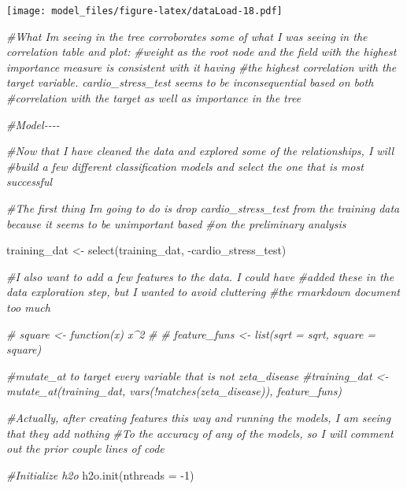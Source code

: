 \documentclass[
]{article}
\newenvironment{Shaded}{\begin{snugshade}}{\end{snugshade}}
\newcommand{\AttributeTok}[1]{\textcolor[rgb]{0.77,0.63,0.00}{#1}}
\newcommand{\CommentTok}[1]{\textcolor[rgb]{0.56,0.35,0.01}{\textit{#1}}}
\newcommand{\DecValTok}[1]{\textcolor[rgb]{0.00,0.00,0.81}{#1}}
\newcommand{\FunctionTok}[1]{\textcolor[rgb]{0.00,0.00,0.00}{#1}}
\newcommand{\NormalTok}[1]{#1}
\newcommand{\OtherTok}[1]{\textcolor[rgb]{0.56,0.35,0.01}{#1}}
\newcommand{\SpecialCharTok}[1]{\textcolor[rgb]{0.00,0.00,0.00}{#1}}
\begin{document}
\texttt{[image: model\_files/figure-latex/dataLoad-18.pdf]}

\begin{Shaded}
\begin{Highlighting}[]
\CommentTok{\#What I\textquotesingle{}m seeing in the tree corroborates some of what I was seeing in the correlation table and plot:}
\CommentTok{\#weight as the root node and the field with the highest importance measure is consistent with it having}
\CommentTok{\#the highest correlation with the target variable. cardio\_stress\_test seems to be inconsequential based on both}
\CommentTok{\#correlation with the target as well as importance in the tree}
\end{Highlighting}
\end{Shaded}

\begin{Shaded}
\begin{Highlighting}[]
\CommentTok{\#Model{-}{-}{-}{-}}

\CommentTok{\#Now that I have cleaned the data and explored some of the relationships, I will }
\CommentTok{\#build a few different classification models and select the one that is most successful}


\CommentTok{\#The first thing I\textquotesingle{}m going to do is drop cardio\_stress\_test from the training data because it seems to be unimportant based }
\CommentTok{\#on the preliminary analysis}

\NormalTok{training\_dat }\OtherTok{\textless{}{-}} \FunctionTok{select}\NormalTok{(training\_dat, }\SpecialCharTok{{-}}\NormalTok{cardio\_stress\_test)}

\CommentTok{\#I also want to add a few features to the data. I could have}
\CommentTok{\#added these in the data exploration step, but I wanted to avoid cluttering}
\CommentTok{\#the rmarkdown document too much}

\CommentTok{\# square \textless{}{-} function(x) x\^{}2}
\CommentTok{\# }
\CommentTok{\# feature\_funs \textless{}{-} list(sqrt = sqrt, square = square)}


\CommentTok{\#mutate\_at to target every variable that is not zeta\_disease}
\CommentTok{\#training\_dat \textless{}{-} mutate\_at(training\_dat, vars(!matches(\textquotesingle{}zeta\_disease\textquotesingle{})), feature\_funs)}


\CommentTok{\#Actually, after creating features this way and running the models, I am seeing that they add nothing}
\CommentTok{\#To the accuracy of any of the models, so I will comment out the prior couple lines of code}

\CommentTok{\#Initialize h2o}
\FunctionTok{h2o.init}\NormalTok{(}\AttributeTok{nthreads =} \SpecialCharTok{{-}}\DecValTok{1}\NormalTok{)}
\end{Highlighting}
\end{Shaded}
\end{document}
